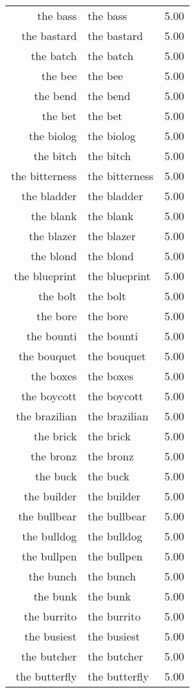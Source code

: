 \begin{table}[ht]
\begin{tabular}{rlr}
  the bass & the bass & 5.00 \\ 
  the bastard & the bastard & 5.00 \\ 
  the batch & the batch & 5.00 \\ 
  the bee & the bee & 5.00 \\ 
  the bend & the bend & 5.00 \\ 
  the bet & the bet & 5.00 \\ 
  the biolog & the biolog & 5.00 \\ 
  the bitch & the bitch & 5.00 \\ 
  the bitterness & the bitterness & 5.00 \\ 
  the bladder & the bladder & 5.00 \\ 
  the blank & the blank & 5.00 \\ 
  the blazer & the blazer & 5.00 \\ 
  the blond & the blond & 5.00 \\ 
  the blueprint & the blueprint & 5.00 \\ 
  the bolt & the bolt & 5.00 \\ 
  the bore & the bore & 5.00 \\ 
  the bounti & the bounti & 5.00 \\ 
  the bouquet & the bouquet & 5.00 \\ 
  the boxes & the boxes & 5.00 \\ 
  the boycott & the boycott & 5.00 \\ 
  the brazilian & the brazilian & 5.00 \\ 
  the brick & the brick & 5.00 \\ 
  the bronz & the bronz & 5.00 \\ 
  the buck & the buck & 5.00 \\ 
  the builder & the builder & 5.00 \\ 
  the bullbear & the bullbear & 5.00 \\ 
  the bulldog & the bulldog & 5.00 \\ 
  the bullpen & the bullpen & 5.00 \\ 
  the bunch & the bunch & 5.00 \\ 
  the bunk & the bunk & 5.00 \\ 
  the burrito & the burrito & 5.00 \\ 
  the busiest & the busiest & 5.00 \\ 
  the butcher & the butcher & 5.00 \\ 
  the butterfly & the butterfly & 5.00 \\ 

\end{tabular}
\end{table}
